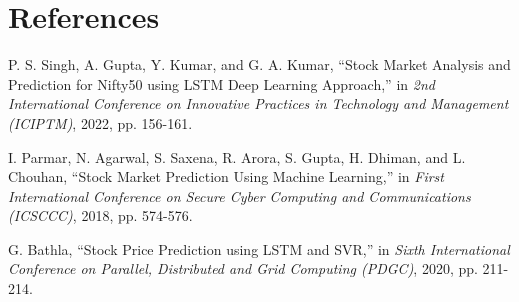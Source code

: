 \documentclass[conference]{IEEEtran}
\begin{document}
\section{References}
\renewcommand{\refname}{}
\begin{thebibliography}{00}

     P. S. Singh, A. Gupta, Y. Kumar, and G. A. Kumar, “Stock Market Analysis and Prediction for Nifty50 using LSTM Deep Learning Approach,” in \textit{2nd International Conference on Innovative Practices in Technology and Management (ICIPTM)}, 2022, pp. 156-161.
    
     I. Parmar, N. Agarwal, S. Saxena, R. Arora, S. Gupta, H. Dhiman, and L. Chouhan, “Stock Market Prediction Using Machine Learning,” in \textit{First International Conference on Secure Cyber Computing and Communications (ICSCCC)}, 2018, pp. 574-576.
    
     G. Bathla, “Stock Price Prediction using LSTM and SVR,” in \textit{Sixth International Conference on Parallel, Distributed and Grid Computing (PDGC)}, 2020, pp. 211-214.
    
\end{thebibliography}

\end{document}
